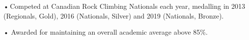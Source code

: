 \documentclass[]{resume}
\begin{document}
\begin{minipage}[t]{0.66\textwidth}
 
\descript{}
\noindent
\hspace{3em}%
\begin{minipage}{0.85\textwidth\vspace{2pt}}
•\,Competed at Canadian Rock Climbing Nationals each year, medalling in 2013 (Regionals, Gold), 2016 (Nationals, Silver) and 2019 (Nationals, Bronze). 
\end{minipage}
\sectionsep

 
\descript{}
\noindent
\hspace{3em}%
\begin{minipage}{0.85\textwidth\vspace{2pt}}
• Awarded for maintaining an overall academic average above 85\%.
\end{minipage}
\end{minipage} 
\end{document}
